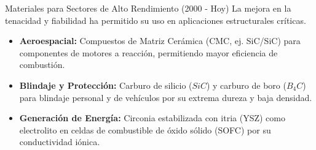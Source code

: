 \begin{frame}{Materiales para Sectores de Alto Rendimiento (2000 - Hoy)}
  La mejora en la tenacidad y fiabilidad ha permitido su uso en aplicaciones 
	estructurales críticas.
  
  \begin{itemize}
    \item \textbf{Aeroespacial:} Compuestos de Matriz Cerámica (CMC, ej. SiC/SiC) 
			para componentes de motores a reacción, permitiendo mayor eficiencia de 
			combustión.
    \vspace{0.5cm}
    \item \textbf{Blindaje y Protección:} Carburo de silicio ($SiC$) y carburo 
			de boro ($B_4C$) para blindaje personal y de vehículos por su extrema 
			dureza y baja densidad.
    \vspace{0.5cm}
    \item \textbf{Generación de Energía:} Circonia estabilizada con itria (YSZ) 
			como electrolito en celdas de combustible de óxido sólido (SOFC) por su 
			conductividad iónica.
  \end{itemize}
\end{frame}

